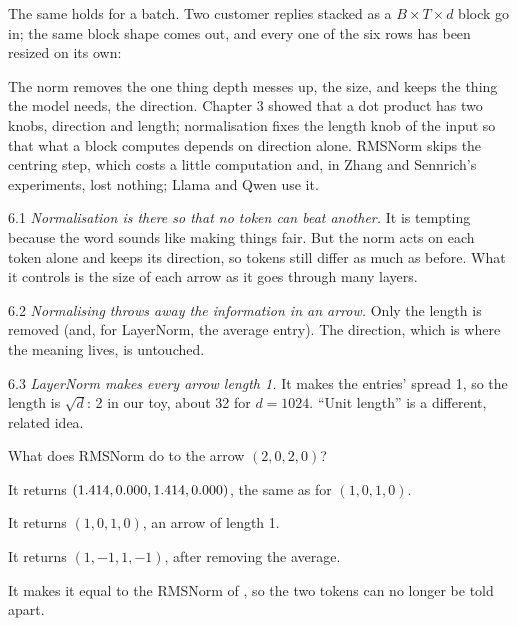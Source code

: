 The same holds for a batch. Two customer replies stacked as a $B\times T\times d$ block go in; the same block
shape comes out, and every one of the six rows has been resized on its own:

\par\medskip\noindent\begin{minipage}{\linewidth}\centering

\end{minipage}\par\medskip

\Why The norm removes the one thing depth messes up, the size, and keeps the thing the model needs, the
direction. Chapter 3 showed that a dot product has two knobs, direction and length; normalisation fixes the
length knob of the input so that what a block computes depends on direction alone. RMSNorm skips the centring
step, which costs a little computation and, in Zhang and Sennrich's experiments, lost nothing; Llama and Qwen use
it.

\begin{wrongidea}{6.1}
\emph{Normalisation is there so that no token can beat another.} It is tempting because the word sounds like making things
fair. But the norm acts on each token alone and keeps its direction, so tokens still differ as much as before.
What it controls is the size of each arrow as it goes through many layers.
\end{wrongidea}

\begin{wrongidea}{6.2}
\emph{Normalising throws away the information in an arrow.} Only the length is removed (and, for LayerNorm, the
average entry). The direction, which is where the meaning lives, is untouched.
\end{wrongidea}

\begin{wrongidea}{6.3}
\emph{LayerNorm makes every arrow length 1.} It makes the entries' spread 1, so the length is $\sqrt d$: 2 in our
toy, about 32 for $d=1024$. ``Unit length'' is a different, related idea.
\end{wrongidea}

\begin{checkq}
What does RMSNorm do to the arrow $(2,0,2,0)$?
\begin{options}
\item It returns $(1.414, 0.000, 1.414, 0.000)$, the same as for $(1,0,1,0)$.
\item It returns $(1,0,1,0)$, an arrow of length 1.
\item It returns $(1,-1,1,-1)$, after removing the average.
\item It makes it equal to the RMSNorm of , so the two tokens can no longer be told apart.
\end{options}
\end{checkq}

